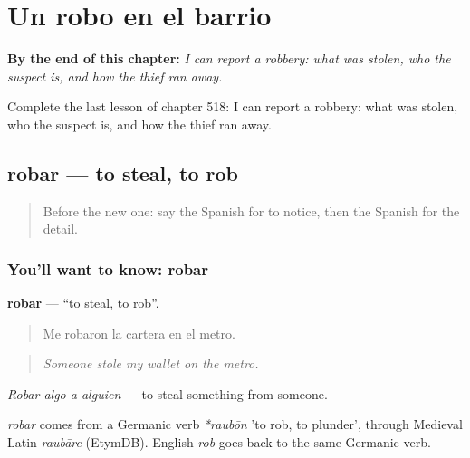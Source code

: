 
\chapter{Un robo en el barrio}
\label{ch:es-un-robo-en-el-barrio}

\begin{chapteropening}
\textbf{By the end of this chapter:} \emph{I can report a robbery: what was stolen, who the suspect is, and how the thief ran away.}

Complete the last lesson of chapter 518: I can report a robbery: what was stolen, who the suspect is, and how the thief ran away.
\end{chapteropening}

\section[robar]{robar — to steal, to rob}

\label{lesson:ES-C518-robar}



\begin{quote}
Before the new one: say the Spanish for to notice, then the Spanish for the detail.
\end{quote}

\subsection*{You'll want to know: robar}
\textbf{robar} — \textquotedblleft{}to steal, to rob\textquotedblright{}.

\begin{quote}
Me robaron la cartera en el metro.
\end{quote}

\begin{quote}
\emph{Someone stole my wallet on the metro.}
\end{quote}

\emph{Robar algo a alguien} — to steal something from someone.

\begin{cousinweb}
\emph{robar} comes from a Germanic verb \emph{*raubōn} 'to rob, to plunder', through Medieval Latin \emph{raubāre} (EtymDB). English \emph{rob} goes back to the same Germanic verb.
\end{cousinweb}

